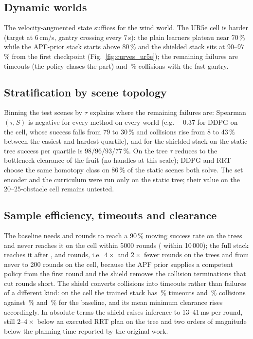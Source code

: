 \documentclass[conference]{IEEEtran}
\begin{document}
\subsection{Dynamic worlds}
The velocity-augmented state suffices for the wind world. The UR5e cell is harder (target at 6\,cm/s, gantry crossing every 7\,s): the plain learners plateau near 70\,\% while the APF-prior stack starts above 80\,\% and the shielded stack sits at 90--97\,\% from the first checkpoint (Fig.~\ref{fig:curves_ur5e}); the remaining failures are timeouts (the policy chases the part) and \Curetdherapfshield{}\,\% collisions with the fast gantry.


\subsection{Stratification by scene topology}
Binning the test scenes by $\tau$ explains where the remaining failures are: Spearman$(\tau,S)$ is negative for every method on every world (e.g.\ $-0.37$ for DDPG on the cell, whose success falls from 79 to 30\,\% and collisions rise from 8 to 43\,\% between the easiest and hardest quartile), and for the shielded stack on the static tree success per quartile is 98/96/93/77\,\%. On the tree $\tau$ reduces to the bottleneck clearance of the fruit (no handles at this scale); DDPG and RRT choose the same homotopy class on 86\,\% of the static scenes both solve. The set encoder and the curriculum were run only on the static tree; their value on the 20--25-obstacle cell remains untested.


\subsection{Sample efficiency, timeouts and clearance}
The baseline needs \Rstaticbase{} and \Rwindbase{} rounds to reach a 90\,\% moving success rate on the trees and never reaches it on the cell within 5000 rounds (\Rurepaperddpgk{} within 10\,000); the full stack reaches it after \Rstaticfullk{}, \Rwindfullk{} and \Rurefullk{} rounds, i.e.\ $4\times$ and $2\times$ fewer rounds on the trees and from never to 200 rounds on the cell, because the APF prior supplies a competent policy from the first round and the shield removes the collision terminations that cut rounds short. The shield converts collisions into timeouts rather than failures of a different kind: on the cell the trained stack has \Ouretdherapfshield{}\,\% timeouts and \Curetdherapfshield{}\,\% collisions against \Ourebase{}\,\% and \Curebase{}\,\% for the baseline, and its mean minimum clearance rises accordingly. In absolute terms the shield raises inference to 13--41\,ms per round, still $2$--$4\times$ below an executed RRT plan on the tree and two orders of magnitude below the planning time reported by the original work.
\end{document}

